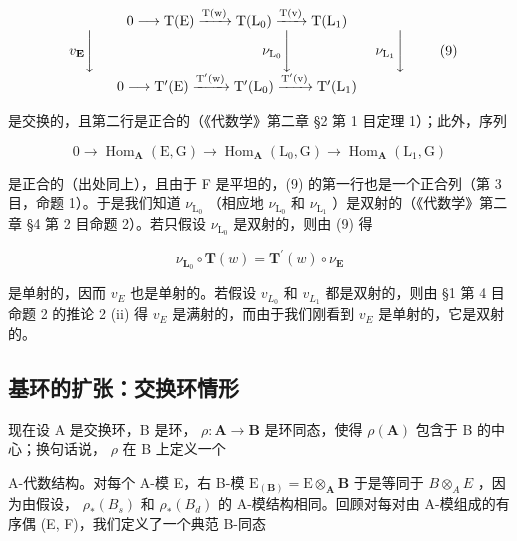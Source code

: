 \[
\begin{array}{c} 0 \longrightarrow \mathrm{T(E)} \xrightarrow {\mathrm{T(w)}} \mathrm {T(L_ {0})} \xrightarrow {\mathrm{T(v)}} \mathrm {T(L_ {1})} \\ v _ {\mathbf {E}} \Biggl \downarrow \qquad \qquad \qquad \qquad \qquad \qquad \nu_ {\mathrm {L_ {0}}} \Biggl \downarrow \qquad \qquad \qquad \nu_ {\mathrm {L_ {1}}} \Biggl \downarrow \\ 0 \longrightarrow \mathrm {T^ {\prime} (E)} \xrightarrow {\mathrm {T^ {\prime} (w)}} \mathrm {T^ {\prime} (L_ {0})} \xrightarrow {\mathrm {T^ {\prime} (v)}} \mathrm {T^ {\prime} (L_ {1})} \end{array}\tag{9}
\]

是交换的，且第二行是正合的（《代数学》第二章 §2 第 1 目定理 1）；此外，序列

\[
0 \rightarrow \operatorname{Hom} _ {\mathbf {A}} (\mathrm{E}, \mathrm{G}) \rightarrow \operatorname{Hom} _ {\mathbf {A}} (\mathrm{L} _ {0}, \mathrm{G}) \rightarrow \operatorname{Hom} _ {\mathbf {A}} (\mathrm{L} _ {1}, \mathrm{G})
\]

是正合的（出处同上），且由于 F 是平坦的，(9) 的第一行也是一个正合列（第 3 目，命题 1）。于是我们知道 \(\nu_{\mathrm{L}_0}\) （相应地 \(\nu_{\mathrm{L}_0}\) 和 \(\nu_{\mathrm{L}_1}\) ）是双射的（《代数学》第二章 §4 第 2 目命题 2）。若只假设 \(\nu_{\mathrm{L}_0}\) 是双射的，则由 (9) 得

\[
\nu_ {\mathbf {L} _ {0}} \circ \mathbf {T} (w) = \mathbf {T} ^ {\prime} (w) \circ \nu_ {\mathbf {E}}
\]

是单射的，因而 \(v_{E}\) 也是单射的。若假设 \(v_{L_{0}}\) 和 \(v_{L_{1}}\) 都是双射的，则由 §1 第 4 目命题 2 的推论 2 (ii) 得 \(v_{E}\) 是满射的，而由于我们刚看到 \(v_{E}\) 是单射的，它是双射的。

\subsection{基环的扩张：交换环情形}

现在设 A 是交换环，B 是环， \(\rho: \mathbf{A} \to \mathbf{B}\) 是环同态，使得 \(\rho(\mathbf{A})\) 包含于 B 的中心；换句话说， \(\rho\) 在 B 上定义一个

A-代数结构。对每个 A-模 E，右 B-模 \(\mathrm{E}_{(\mathbf{B})} = \mathrm{E} \otimes_{\mathbf{A}} \mathbf{B}\) 于是等同于 \(B \otimes_{A} E\) ，因为由假设， \(\rho_{*}(B_{s})\) 和 \(\rho_{*}(B_{d})\) 的 A-模结构相同。回顾对每对由 A-模组成的有序偶 (E, F)，我们定义了一个典范 B-同态

